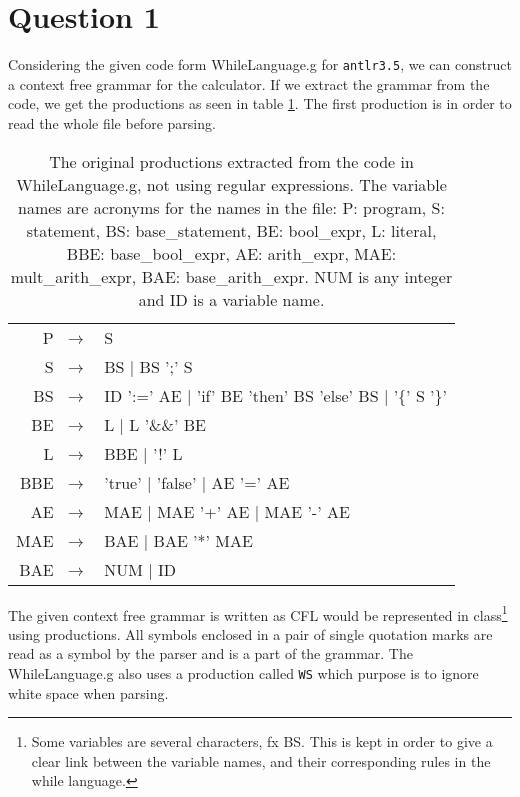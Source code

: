 \section*{Question 1}

Considering the given code form WhileLanguage.g for \texttt{antlr3.5}, we can construct a context free grammar for the calculator. If we extract the grammar from the code, we get the productions as seen in table \ref{tab:origProd}. The first production is in order to read the whole file before parsing.

\begin{table}[H]
    \centering
    \begin{tabular}{|rl|}
    \hline
    P $\;\rightarrow$ & S \\
    S  $\;\rightarrow$ & BS $|$ BS ';' S \\
    BS  $\;\rightarrow$ & ID ':=' AE $|$ 'if' BE 'then' BS 'else' BS $|$ '\{' S '\}' \\
    BE $\;\rightarrow$ & L $|$ L '\&\&' BE \\
    L $\;\rightarrow$ & BBE $|$ '!' L \\
    BBE $\;\rightarrow$ & 'true' $|$ 'false' $|$ AE '=' AE\\
    AE $\;\rightarrow$ & MAE $|$ MAE '+' AE $|$ MAE '-' AE \\
    MAE $\;\rightarrow$ & BAE $|$ BAE '*' MAE \\
    BAE $\;\rightarrow$ & NUM $|$ ID \\

    \hline
    \end{tabular}
    \caption{The original productions extracted from the code in WhileLanguage.g, not using regular expressions. The variable names are acronyms for the names in the file: P: program, S: statement, BS: base\_statement, BE: bool\_expr, L: literal, BBE: base\_bool\_expr, AE: arith\_expr, MAE: mult\_arith\_expr, BAE: base\_arith\_expr. NUM is any integer and ID is a variable name. }
    \label{tab:origProd}
\end{table}

The given context free grammar is written as CFL would be represented in class\footnote{Some variables are several characters, fx BS. This is kept in order to give a clear link between the variable names, and their corresponding rules in the while language.} using productions. All symbols enclosed in a pair of single quotation marks are read as a symbol by the parser and is a part of the grammar. The WhileLanguage.g also uses a production called \texttt{WS} which purpose is to ignore white space when parsing.